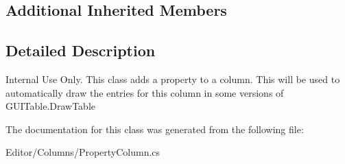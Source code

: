 \subsection*{Additional Inherited Members}


\subsection{Detailed Description}
Internal Use Only. This class adds a property to a column. This will be used to automatically draw the entries for this column in some versions of G\+U\+I\+Table.\+Draw\+Table 



The documentation for this class was generated from the following file\+:\begin{DoxyCompactItemize}
\item 
Editor/\+Columns/Property\+Column.\+cs\end{DoxyCompactItemize}
